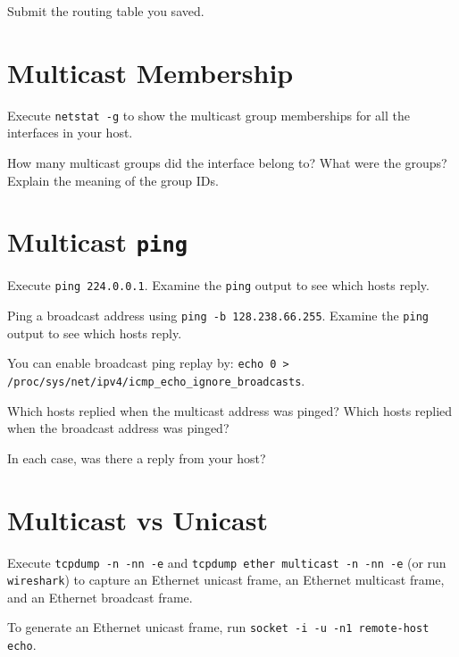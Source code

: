 \documentclass{../UTNetLab}
\begin{document}
    \begin{report}
    \item Submit the routing table you saved.
    \end{report}

\section{Multicast Membership}
    Execute \lstinline{netstat -g} to show the multicast group memberships for all the interfaces in your host.
    
    \begin{report}
    \item How many multicast groups did the interface belong to? What were the groups? Explain the meaning of the group IDs.
    \end{report}

\section{Multicast \texttt{ping}}
    Execute \lstinline{ping 224.0.0.1}.
    Examine the \lstinline{ping} output to see which hosts reply.

    Ping a broadcast address using \lstinline{ping -b 128.238.66.255}.
    Examine the \lstinline{ping} output to see which hosts reply.

    You can enable broadcast ping replay by: \lstinline{echo 0 > /proc/sys/net/ipv4/icmp_echo_ignore_broadcasts}.
    
    \begin{report}
    \item Which hosts replied when the multicast address was pinged?
    Which hosts replied when the broadcast address was pinged?

    \item In each case, was there a reply from your host?
    \end{report}

\section{Multicast vs Unicast}
    Execute \lstinline{tcpdump -n -nn -e} and \lstinline{tcpdump ether multicast -n -nn -e} (or run \lstinline{wireshark}) to capture an Ethernet unicast frame, an Ethernet multicast frame, and an Ethernet broadcast frame.

    To generate an Ethernet unicast frame, run \lstinline[emph={your-host, remote-host}]{socket -i -u -n1 remote-host echo}.
\end{document}
